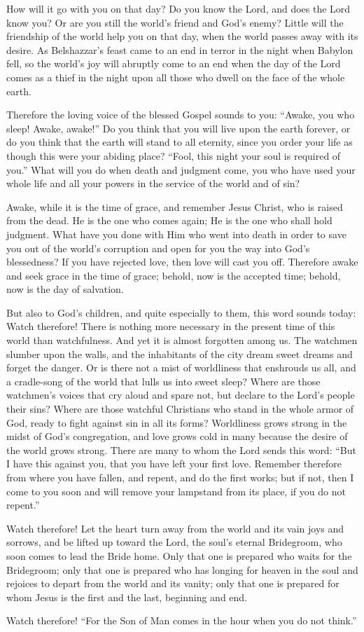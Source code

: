 How will it go with you on that day? Do you know the Lord, and does the Lord know you? Or are you still the world’s friend and God’s enemy? Little will the friendship of the world help you on that day, when the world passes away with its desire. As Belshazzar’s feast came to an end in terror in the night when Babylon fell, so the world’s joy will abruptly come to an end when the day of the Lord comes as a thief in the night upon all those who dwell on the face of the whole earth.

Therefore the loving voice of the blessed Gospel sounds to you: “Awake, you who sleep! Awake, awake!” Do you think that you will live upon the earth forever, or do you think that the earth will stand to all eternity, since you order your life as though this were your abiding place? “Fool, this night your soul is required of you.” What will you do when death and judgment come, you who have used your whole life and all your powers in the service of the world and of sin?

Awake, while it is the time of grace, and remember Jesus Christ, who is raised from the dead. He is the one who comes again; He is the one who shall hold judgment. What have you done with Him who went into death in order to save you out of the world’s corruption and open for you the way into God’s blessedness? If you have rejected love, then love will cast you off. Therefore awake and seek grace in the time of grace; behold, now is the accepted time; behold, now is the day of salvation.

But also to God’s children, and quite especially to them, this word sounds today: Watch therefore! There is nothing more necessary in the present time of this world than watchfulness. And yet it is almost forgotten among us. The watchmen slumber upon the walls, and the inhabitants of the city dream sweet dreams and forget the danger. Or is there not a mist of worldliness that enshrouds us all, and a cradle-song of the world that lulls us into sweet sleep? Where are those watchmen’s voices that cry aloud and spare not, but declare to the Lord’s people their sins? Where are those watchful Christians who stand in the whole armor of God, ready to fight against sin in all its forms? Worldliness grows strong in the midst of God’s congregation, and love grows cold in many because the desire of the world grows strong. There are many to whom the Lord sends this word: “But I have this against you, that you have left your first love. Remember therefore from where you have fallen, and repent, and do the first works; but if not, then I come to you soon and will remove your lampstand from its place, if you do not repent.”

Watch therefore! Let the heart turn away from the world and its vain joys and sorrows, and be lifted up toward the Lord, the soul’s eternal Bridegroom, who soon comes to lead the Bride home. Only that one is prepared who waits for the Bridegroom; only that one is prepared who has longing for heaven in the soul and rejoices to depart from the world and its vanity; only that one is prepared for whom Jesus is the first and the last, beginning and end.

Watch therefore! “For the Son of Man comes in the hour when you do not think.”

